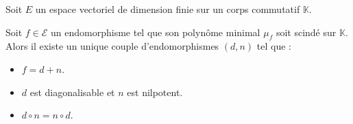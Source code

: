 






	Soit $E$ un espace vectoriel de dimension finie sur un corps commutatif $\mathbb{K}$.

	\begin{theorem}
		Soit $f \in \mathcal{E}$ un endomorphisme tel que son polynôme minimal $\mu_f$ soit scindé sur $\mathbb{K}$. Alors il existe un unique couple d'endomorphismes $(d, n)$ tel que :
		\begin{itemize}
			\item $f = d + n$.
			\item $d$ est diagonalisable et $n$ est nilpotent.
			\item $d \circ n = n \circ d$.
		\end{itemize}
	\end{theorem}

